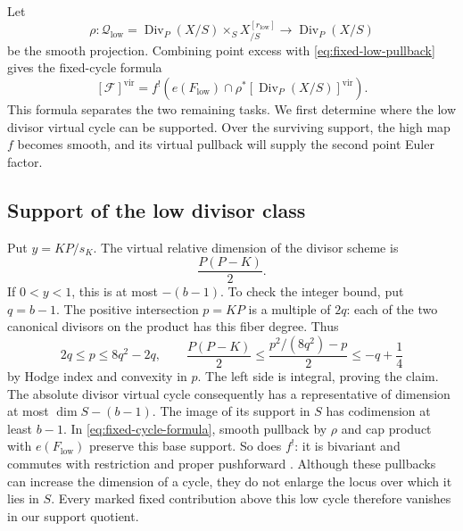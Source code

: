 Let
\[
 \rho:\mathcal Q_{\mathrm{low}}
   =\operatorname{Div}_{P}(X/S)\times_S X^{[r_{\mathrm{low}}]}_{/S}
   \longrightarrow\operatorname{Div}_{P}(X/S)
\]
be the smooth projection.  Combining point excess with
\eqref{eq:fixed-low-pullback} gives the fixed-cycle formula
\begin{equation}
\label{eq:fixed-cycle-formula}
 [\mathcal F]^{\mathrm{vir}}
 =f^!\left(
   e(F_{\mathrm{low}})\cap
   \rho^*[\operatorname{Div}_{P}(X/S)]^{\mathrm{vir}}
       \right).
\end{equation}
This formula separates the two remaining tasks.  We first determine
where the low divisor virtual cycle can be supported.  Over the
surviving support, the high map \(f\) becomes smooth, and its virtual
pullback will supply the second point Euler factor.

\subsection{Support of the low divisor class}

Put \(y=KP/s_K\).
The virtual relative dimension of the divisor scheme is
\begin{equation}
\label{eq:divisor-virtual-dimension}
 \frac{P(P-K)}2.
\end{equation}
If \(0<y<1\), this is at most \(-(b-1)\).
To check the integer bound, put \(q=b-1\).
The positive intersection \(p=KP\) is a multiple of \(2q\):
each of the two canonical divisors on the product has this fiber
degree. Thus
\[
 2q\leq p\leq8q^2-2q,\qquad
 \frac{P(P-K)}2
 \leq\frac{p^2/(8q^2)-p}{2}
 \leq-q+\frac14
\]
by Hodge index and convexity in \(p\).
The left side is integral, proving the claim.
The absolute divisor virtual cycle consequently has a representative
of dimension at most \(\dim S-(b-1)\).  The image of its support in
\(S\) has codimension at least \(b-1\).  In
\eqref{eq:fixed-cycle-formula}, smooth pullback by \(\rho\) and cap
product with \(e(F_{\mathrm{low}})\) preserve this base support.
So does \(f^!\): it is bivariant and commutes with restriction and
proper pushforward \cite[Theorems 4.1 and 4.4]{Manolache}.
Although these pullbacks can increase the dimension of a cycle, they
do not enlarge the locus over which it lies in \(S\).  Every marked
fixed contribution above this low cycle therefore vanishes in our
support quotient.

